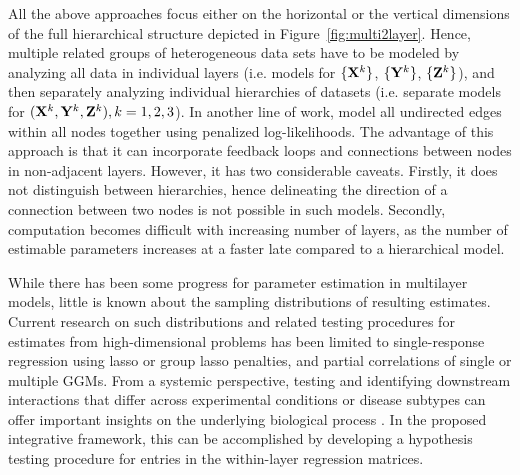 All the above approaches focus either on the horizontal or the vertical dimensions of the full hierarchical structure depicted in Figure~\ref{fig:multi2layer}. Hence, multiple related groups of heterogeneous data sets have to be modeled by analyzing all data in individual layers (i.e. models for $\{ {\mathbf{X}}^k \}$, $\{ {\mathbf{Y}}^k \}$, $\{ {\mathbf{Z}}^k \}$), and then separately analyzing individual hierarchies of datasets (i.e. separate models for $({\mathbf{X}}^k, {\mathbf{Y}}^k, {\mathbf{Z}}^k), k = 1,2,3$). In another line of work, \cite{KlingEtal15,ZhangOuyangZhao17} model all undirected edges within all nodes together using penalized log-likelihoods. The advantage of this approach is that it can incorporate feedback loops and connections between nodes in non-adjacent layers. However, it has two considerable caveats. Firstly, it does not distinguish between hierarchies, hence delineating the direction of a connection between two nodes is not possible in such models. Secondly, computation becomes difficult with increasing number of layers, as the number of estimable parameters increases at a faster late compared to a hierarchical model.%

While there has been some progress for parameter estimation in multilayer models, little is known about the sampling distributions of resulting estimates. Current research on such distributions and related testing procedures for estimates from high-dimensional problems has been limited to single-response regression using lasso \citep{ZhangZhang14,JavanmardMontanari14,JavanmardMontanari18,vanDeGeerEtal14} or group lasso \citep{MitraZhang16} penalties, and partial correlations of single \citep{CaiLiu16} or multiple \citep{BelilovskyEtal16,Liu17} GGMs. From a systemic perspective, testing and identifying downstream interactions that differ across experimental conditions or disease subtypes can offer important insights on the underlying biological process \citep{MaoEtal17,LiEtal15}. In the proposed integrative framework, this can be accomplished by developing a hypothesis testing procedure for entries in the within-layer regression matrices.

